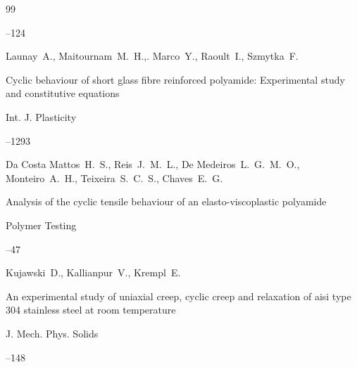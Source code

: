 \begin{thebibliography}{99}



--124







\by Launay~A., Maitournam~M.~H.,. Marco~Y., Raoult~I., Szmytka~F.

\paper Cyclic behaviour of short glass fibre reinforced polyamide: Experimental study and constitutive equations 

\jour Int. J. Plasticity




--1293







\by Da Costa Mattos~H.~S., Reis~J.~M.~L., De Medeiros~L.~G.~M.~O., Monteiro~A.~H., Teixeira~S.~C.~S., Chaves~E.~G.

\paper Analysis of the cyclic tensile behaviour of an elasto-viscoplastic polyamide 

\jour Polymer Testing



--47







\by Kujawski~D., Kallianpur~V., Krempl~E.

\paper An experimental study of uniaxial creep, cyclic creep and relaxation of aisi type 304 stainless steel at room temperature

\jour J. Mech. Phys. Solids




--148







\end{thebibliography}
